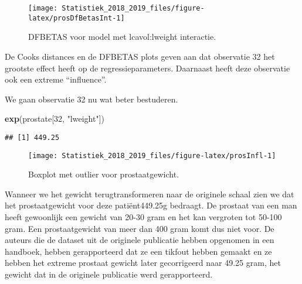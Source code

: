 \documentclass[12pt,dutch,coursenotes]{book}
\newenvironment{Shaded}{\begin{snugshade}}{\end{snugshade}}
\newcommand{\KeywordTok}[1]{\textcolor[rgb]{0.13,0.29,0.53}{\textbf{#1}}}
\newcommand{\DataTypeTok}[1]{\textcolor[rgb]{0.13,0.29,0.53}{#1}}
\newcommand{\DecValTok}[1]{\textcolor[rgb]{0.00,0.00,0.81}{#1}}
\newcommand{\StringTok}[1]{\textcolor[rgb]{0.31,0.60,0.02}{#1}}
\newcommand{\OperatorTok}[1]{\textcolor[rgb]{0.81,0.36,0.00}{\textbf{#1}}}
\newcommand{\NormalTok}[1]{#1}
\theoremstyle{definition}
\theoremstyle{definition}
\theoremstyle{definition}
\theoremstyle{remark}
\begin{document}
\begin{figure}

{\centering \texttt{[image: Statistiek\_2018\_2019\_files/figure-latex/prosDfBetasInt-1]} 

}

\caption{DFBETAS voor model met lcavol:lweight interactie.}\label{fig:prosDfBetasInt}
\end{figure}

De Cooks distances en de DFBETAS plots geven aan dat observatie 32 het
grootste effect heeft op de regressieparameters. Daarnaast heeft deze
observatie ook een extreme ``influence''.

We gaan observatie 32 nu wat beter bestuderen.

\begin{Shaded}
\begin{Highlighting}[]
\KeywordTok{exp}\NormalTok{(prostate[}\DecValTok{32}\NormalTok{, }\StringTok{"lweight"}\NormalTok{])}
\end{Highlighting}
\end{Shaded}

\begin{verbatim}
## [1] 449.25
\end{verbatim}

\begin{Shaded}
\end{Shaded}

\begin{figure}

{\centering \texttt{[image: Statistiek\_2018\_2019\_files/figure-latex/prosInfl-1]} 

}

\caption{Boxplot met outlier voor prostaatgewicht.}\label{fig:prosInfl}
\end{figure}

Wanneer we het gewicht terugtransformeren naar de originele schaal zien
we dat het prostaatgewicht voor deze patiënt449.25g bedraagt. De
prostaat van een man heeft gewoonlijk een gewicht van 20-30 gram en het
kan vergroten tot 50-100 gram. Een prostaatgewicht van meer dan 400 gram
komt dus niet voor. De auteurs die de dataset uit de originele
publicatie hebben opgenomen in een handboek, hebben gerapporteerd dat ze
een tikfout hebben gemaakt en ze hebben het extreme prostaat gewicht
later gecorrigeerd naar 49.25 gram, het gewicht dat in de originele
publicatie werd gerapporteerd.
\end{document}
